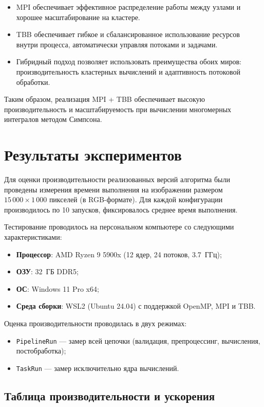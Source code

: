 \documentclass[a4paper,12pt]{article}
\begin{document}
\begin{itemize}
    \item MPI обеспечивает эффективное распределение работы между узлами и хорошее масштабирование на кластере.
    \item TBB обеспечивает гибкое и сбалансированное использование ресурсов внутри процесса, автоматически управляя потоками и задачами.
    \item Гибридный подход позволяет использовать преимущества обоих миров: производительность кластерных вычислений и адаптивность потоковой обработки.
\end{itemize}

Таким образом, реализация MPI + TBB обеспечивает высокую производительность и масштабируемость при вычислении многомерных интегралов методом Симпсона.

\section{Результаты экспериментов}

Для оценки производительности реализованных версий алгоритма были проведены измерения времени выполнения на изображении размером $15\,000 \times 1\,000$ пикселей (в RGB-формате). 
Для каждой конфигурации производилось по 10 запусков, фиксировалось среднее время выполнения.

Тестирование проводилось на персональном компьютере со следующими характеристиками:

\begin{itemize}
    \item \textbf{Процессор}: AMD Ryzen 9 5900x (12 ядер, 24 потоков, 3.7~ГГц);
    \item \textbf{ОЗУ}: 32~ГБ DDR5;
    \item \textbf{ОС}: Windows 11 Pro x64;
    \item \textbf{Среда сборки}: WSL2 (Ubuntu 24.04) с поддержкой OpenMP, MPI и TBB.
\end{itemize}

Оценка производительности проводилась в двух режимах:
\begin{itemize}
    \item \texttt{PipelineRun} — замер всей цепочки (валидация, препроцессинг, вычисления, постобработка);
    \item \texttt{TaskRun} — замер исключительно ядра вычислений.
\end{itemize}

\subsection{Таблица производительности и ускорения}
\end{document}
